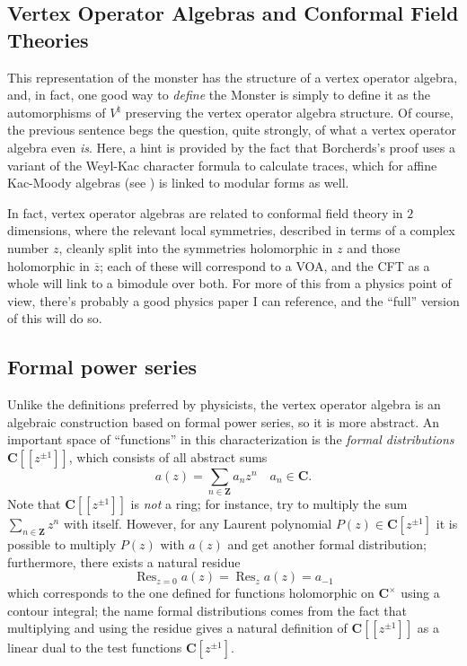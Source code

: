 \documentclass{article}
\newcommand{\CC}{\mathbold{C}}
\newcommand{\ZZ}{\mathbold{Z}}
\DeclareMathOperator{\Res}{Res}
\begin{document}
\subsection{Vertex Operator Algebras and Conformal Field Theories}
This representation of the monster has the structure of a vertex operator algebra, and, in fact, one good way to \textit{define} the Monster is simply to define it as the automorphisms of $V^\natural$ preserving the vertex operator algebra structure.  Of course, the previous sentence begs the question, quite strongly, of what a vertex operator algebra even \textit{is}.  Here, a hint is provided by the fact that Borcherds's proof uses a variant of the Weyl-Kac character formula to calculate traces, which for affine Kac-Moody algebras (see \cite{MR1104219}) is linked to modular forms as well.

In fact, vertex operator algebras are related to conformal field theory in $2$ dimensions, where the relevant local symmetries, described in terms of a complex number $z$, cleanly split into the symmetries holomorphic in $z$ and those holomorphic in $\overline{z}$; each of these will correspond to a VOA, and the CFT as a whole will link to a bimodule over both.  For more of this from a physics point of view, there's probably a good physics paper I can reference, and the ``full'' version of this will do so.

\subsection{Formal power series}

Unlike the definitions preferred by physicists, the vertex operator algebra is an algebraic construction based on formal power series, so it is more abstract.  An important space of ``functions'' in this characterization is the \textit{formal distributions} $\CC[[z^{\pm 1}]]$, which consists of all abstract sums
\[a(z)=\sum_{n \in \ZZ} a_n z^n \quad a_n \in \CC. \]
Note that $\CC[[z^{\pm 1}]]$ is \textit{not} a ring; for instance, try to multiply the sum $\sum_{n \in \ZZ} z^n$ with itself.  However, for any Laurent polynomial $P(z) \in \CC[z^{\pm 1}]$ it is possible to multiply $P(z)$ with $a(z)$ and get another formal distribution; furthermore, there exists a natural residue
\[\Res_{z=0} a(z)=\Res_z a(z)=a_{-1} \]
which corresponds to the one defined for functions holomorphic on $\CC^\times$ using a contour integral; the name formal distributions comes from the fact that multiplying and using the residue gives a natural definition of $\CC[[z^{\pm 1}]]$ as a linear dual to the test functions $\CC[z^{\pm 1}]$.
\end{document}

